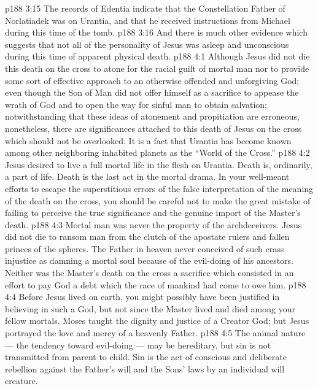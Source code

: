 \vs p188 3:15 The records of Edentia indicate that the Constellation Father of Norlatiadek was on Urantia, and that he received instructions from Michael during this time of the tomb.
\vs p188 3:16 And there is much other evidence which suggests that not all of the personality of Jesus was asleep and unconscious during this time of apparent physical death.
\vs p188 4:1 Although Jesus did not die this death on the cross to atone for the racial guilt of mortal man nor to provide some sort of effective approach to an otherwise offended and unforgiving God; even though the Son of Man did not offer himself as a sacrifice to appease the wrath of God and to open the way for sinful man to obtain salvation; notwithstanding that these ideas of atonement and propitiation are erroneous, nonetheless, there are significances attached to this death of Jesus on the cross which should not be overlooked. It is a fact that Urantia has become known among other neighboring inhabited planets as the “World of the Cross.”
\vs p188 4:2 Jesus desired to live a full mortal life in the flesh on Urantia. Death is, ordinarily, a part of life. Death is the last act in the mortal drama. In your well\hyp{}meant efforts to escape the superstitious errors of the false interpretation of the meaning of the death on the cross, you should be careful not to make the great mistake of failing to perceive the true significance and the genuine import of the Master’s death.
\vs p188 4:3 \pc Mortal man was never the property of the archdeceivers. Jesus did not die to ransom man from the clutch of the apostate rulers and fallen princes of the spheres. The Father in heaven never conceived of such crass injustice as damning a mortal soul because of the evil\hyp{}doing of his ancestors. Neither was the Master’s death on the cross a sacrifice which consisted in an effort to pay God a debt which the race of mankind had come to owe him.
\vs p188 4:4 Before Jesus lived on earth, you might possibly have been justified in believing in such a God, but not since the Master lived and died among your fellow mortals. Moses taught the dignity and justice of a Creator God; but Jesus portrayed the love and mercy of a heavenly Father.
\vs p188 4:5 The animal nature --- the tendency toward evil\hyp{}doing --- may be hereditary, but sin is not transmitted from parent to child. Sin is the act of conscious and deliberate rebellion against the Father’s will and the Sons’ laws by an individual will creature.
